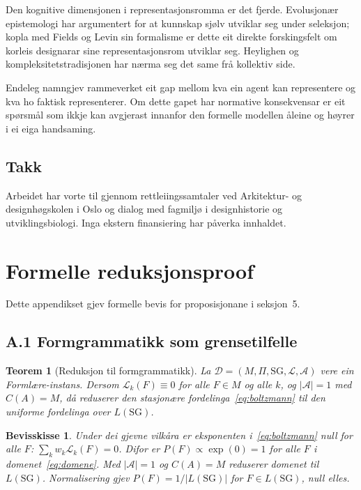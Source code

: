 \documentclass[11pt,a4paper]{article}
\newtheorem{theorem}{Teorem}
\newtheorem*{proof*}{Bevisskisse}
\begin{document}
Den kognitive dimensjonen i representasjonsromma er det fjerde. Evolusjonær epistemologi \citep{campbell1974, popper1972} har argumentert for at kunnskap sjølv utviklar seg under seleksjon; kopla med Fields og Levin sin formalisme er dette eit direkte forskingsfelt om korleis designarar sine representasjonsrom utviklar seg. Heylighen \citeyearpar{heylighen2007} og kompleksitetstradisjonen har nærma seg det same frå kollektiv side.

Endeleg namngjev rammeverket eit gap mellom kva ein agent kan representere og kva ho faktisk representerer. Om dette gapet har normative konsekvensar er eit spørsmål som ikkje kan avgjerast innanfor den formelle modellen åleine og høyrer i ei eiga handsaming.

\subsection*{Takk}
Arbeidet har vorte til gjennom rettleiingssamtaler ved Arkitektur- og designhøgskolen i Oslo og dialog med fagmiljø i designhistorie og utviklingsbiologi. Inga ekstern finansiering har påverka innhaldet.



\appendix
\section{Formelle reduksjonsproof}

Dette appendikset gjev formelle bevis for proposisjonane i seksjon~5.

\subsection*{A.1 Formgrammatikk som grensetilfelle}

\begin{theorem}[Reduksjon til formgrammatikk]
La $\mathcal{D} = (M, \Pi, \mathrm{SG}, \mathcal{L}, \mathcal{A})$ vere ein Formlære-instans. Dersom $\mathcal{L}_k(F) \equiv 0$ for alle $F \in M$ og alle $k$, og $|\mathcal{A}| = 1$ med $C(A) = M$, då reduserer den stasjonære fordelinga~\ref{eq:boltzmann} til den uniforme fordelinga over $L(\mathrm{SG})$.
\end{theorem}

\begin{proof*}
Under dei gjevne vilkåra er eksponenten i~\ref{eq:boltzmann} null for alle $F$: $\sum_k w_k \mathcal{L}_k(F) = 0$. Difor er $P(F) \propto \exp(0) = 1$ for alle $F$ i domenet~\ref{eq:domene}. Med $|\mathcal{A}| = 1$ og $C(A) = M$ reduserer domenet til $L(\mathrm{SG})$. Normalisering gjev $P(F) = 1/|L(\mathrm{SG})|$ for $F \in L(\mathrm{SG})$, null elles.
\end{proof*}
\end{document}
